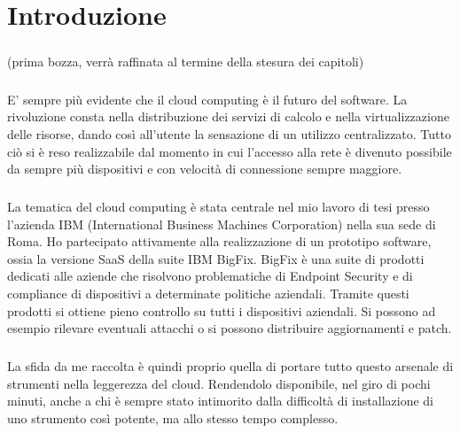 \chapter{Introduzione}

\paragraph{}
(prima bozza, verrà raffinata al termine della stesura dei capitoli)

\paragraph{}
E' sempre più evidente che il cloud computing è il futuro del software. La rivoluzione consta nella distribuzione dei servizi di calcolo e nella virtualizzazione delle risorse, dando così all'utente la sensazione di un utilizzo centralizzato. Tutto ciò si è reso realizzabile dal momento in cui l'accesso alla rete è divenuto possibile da sempre più dispositivi e con velocità di connessione sempre maggiore.
\paragraph{}
La tematica del cloud computing è stata centrale nel mio lavoro di tesi presso l'azienda IBM (International Business Machines Corporation) nella sua sede di Roma. Ho partecipato attivamente alla realizzazione di un prototipo software, ossia la versione SaaS della suite IBM BigFix. BigFix è una suite di prodotti dedicati alle aziende che risolvono problematiche di Endpoint Security e di compliance di dispositivi a determinate politiche aziendali. Tramite questi prodotti si ottiene pieno controllo su tutti i dispositivi aziendali. Si possono ad esempio rilevare eventuali attacchi o si possono distribuire aggiornamenti e patch.
\paragraph{}
La sfida da me raccolta è quindi proprio quella di portare tutto questo arsenale di strumenti nella leggerezza del cloud. Rendendolo disponibile, nel giro di pochi minuti, anche a chi è sempre stato intimorito dalla difficoltà di installazione di uno strumento così potente, ma allo stesso tempo complesso.